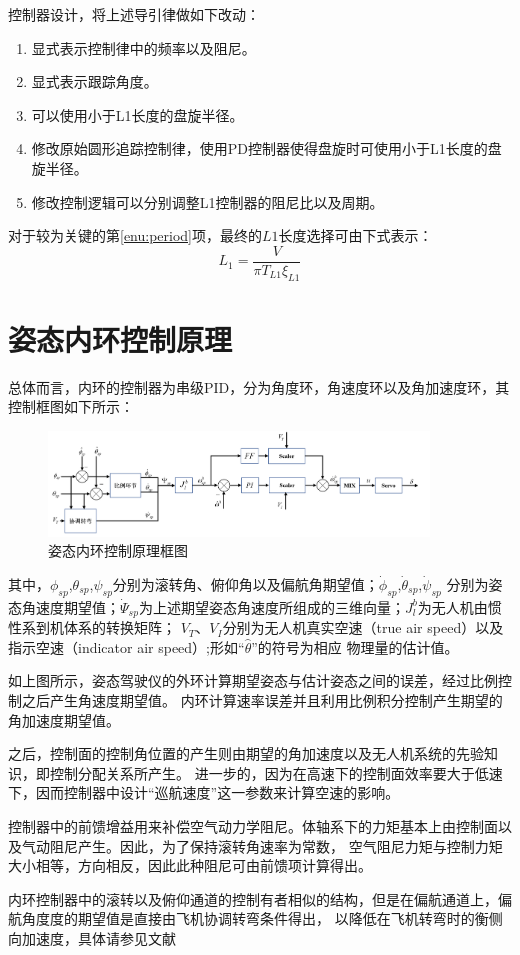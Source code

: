 控制器设计，将上述导引律做如下改动：
\begin{enumerate}
    \item 显式表示控制律中的频率以及阻尼。
    \item 显式表示跟踪角度。
    \item 可以使用小于L1长度的盘旋半径。
    \item 修改原始圆形追踪控制律，使用PD控制器使得盘旋时可使用小于L1长度的盘旋半径。
    \item 修改控制逻辑可以分别调整L1控制器的阻尼比以及周期。\label{enu:period}
\end{enumerate}
对于较为关键的第\ref{enu:period}项，最终的$L1$长度选择可由下式表示：
 \begin{equation}
     L_1 = \frac{V}{\pi T_{L1} \xi_{L1}}
\end{equation}
\section{姿态内环控制原理}
总体而言，内环的控制器为串级PID，分为角度环，角速度环以及角加速度环，其控制框图如下所示：
\begin{figure}[H]
    \centering
    \includegraphics[width=0.90\textwidth]{figures/c3/attitude_inner_loop}
    \caption{姿态内环控制原理框图}\label{c3-attitude_inner_loop}
\end{figure}
其中，$\phi_{sp}$,$\theta_{sp}$,$\psi_{sp}$分别为滚转角、俯仰角以及偏航角期望值；$\dot{\phi}_{sp}$,$\dot{\theta}_{sp}$,$\dot{\psi}_{sp}$
分别为姿态角速度期望值；$\dot{\Psi}_{sp}$为上述期望姿态角速度所组成的三维向量；$J^{b}_l$为无人机由惯性系到机体系的转换矩阵；
$V_T$、$V_I$分别为无人机真实空速（true air speed）以及指示空速（indicator air speed）;形如“$\hat{\theta}$”的符号为相应
物理量的估计值。

如上图所示，姿态驾驶仪的外环计算期望姿态与估计姿态之间的误差，经过比例控制之后产生角速度期望值。
内环计算速率误差并且利用比例积分控制产生期望的角加速度期望值。

之后，控制面的控制角位置的产生则由期望的角加速度以及无人机系统的先验知识，即控制分配关系所产生。
进一步的，因为在高速下的控制面效率要大于低速下，因而控制器中设计“巡航速度”这一参数来计算空速的影响。

控制器中的前馈增益用来补偿空气动力学阻尼。体轴系下的力矩基本上由控制面以及气动阻尼产生。因此，为了保持滚转角速率为常数，
空气阻尼力矩与控制力矩大小相等，方向相反，因此此种阻尼可由前馈项计算得出。

内环控制器中的滚转以及俯仰通道的控制有者相似的结构，但是在偏航通道上，偏航角度度的期望值是直接由飞机协调转弯条件得出，
以降低在飞机转弯时的衡侧向加速度，具体请参见文献\cite{Fangzhenping2005}
